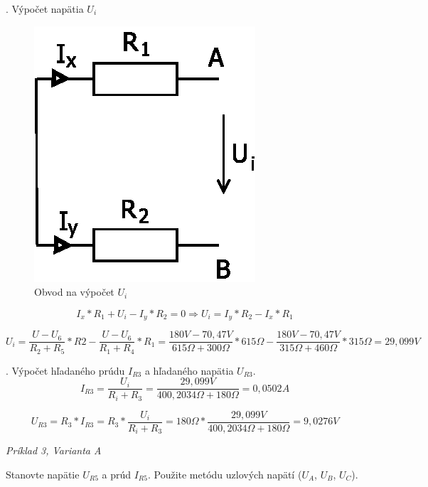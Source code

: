 \documentclass[a4paper,12pt]{article}
\begin{document}
. Výpočet napätia $U_i$
\begin{figure}[!htb]
\centering
\includegraphics[scale=1.1]{p2/p6.eps}
\caption{Obvod na výpočet $U_i$}
\end{figure}


\begin{equation}
I_x * R_1 + U_ i  - I_y * R_2 = 0  \Rightarrow U_i = I_y * R_2 - I_x * R_1
\end{equation}

\begin{equation}
U_i = \frac{U - U_6}{R_2 + R_5} * R2 - \frac{U - U_6}{R_1 + R_4} * R_1 = \frac{180V - 70,47V}{615\Omega + 300\Omega} * 615\Omega - \frac{180V - 70,47V}{315\Omega + 460\Omega} * 315\Omega = 29,099V
\end{equation}

. Výpočet hľadaného prúdu $I_{R3}$ a hľadaného napätia $U_{R3}$.
\begin{equation}
I_{R3} = \frac{U_i}{R_i + R_3} = \frac{29,099V}{400,2034\Omega + 180\Omega} = 0,0502A
\end{equation}

\begin{equation}
U_{R3} = R_3 * I_{R3} = R_3 * \frac{U_i}{R_i + R_3} = 180\Omega * \frac{29,099V}{400,2034\Omega + 180\Omega} = 9,0276V
\end{equation}


\newpage
\begin{center}
\emph{Príklad 3, Varianta A}
\end{center}

\bigskip
Stanovte napätie $U_{R5}$ a prúd $I_{R5}$.
Použite metódu uzlových napätí ($U_A$, $U_B$, $U_C$).
\bigskip
\end{document}
